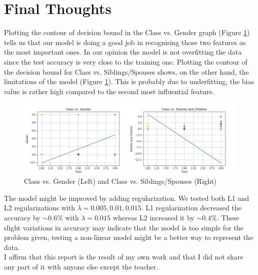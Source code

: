 \documentclass[10pt,a4paper]{report}
\begin{document}
\section{Final Thoughts}
Plotting the contour of decision bound in the Class vs. Gender graph (Figure \ref{fig:conc}) tells us that our model is doing a good job in recognising those two features as the most important ones. In our opinion the model is not overfitting the data since the test accuracy is very close to the training one. Plotting the contour of the decision bound for Class vs. Siblings/Spouses shows, on the other hand, the limitations of the model (Figure \ref{fig:conc}). This is probably due to underfitting, the bias value is rather high compared to the second most influential feature.
\begin{figure}[!ht]
\centering
\includegraphics[width=\linewidth]{conc.png}
\caption{Class vs. Gender (Left) and Class vs. Siblings/Spouses (Right)}
\label{fig:conc}
\end{figure}
The model might be improved by adding regularization. We tested both L1 and L2 regularizations with $\lambda=0.005, 0.01, 0.015$. L1 regularization decreased the accuracy by $\sim 0.6 \%$ with $\lambda=0.015$ whereas L2 increased it by $\sim 0.4 \%$. These slight variations in accuracy may indicate that the model is too simple for the problem given, testing a non-linear model might be a better way to represent the data.
\vspace*{\fill}
\\
I affirm that this report is the result of my own work and that I did not share any part of it with anyone else except the teacher.
\\ \\ \\ \\ \\     
\end{document}
